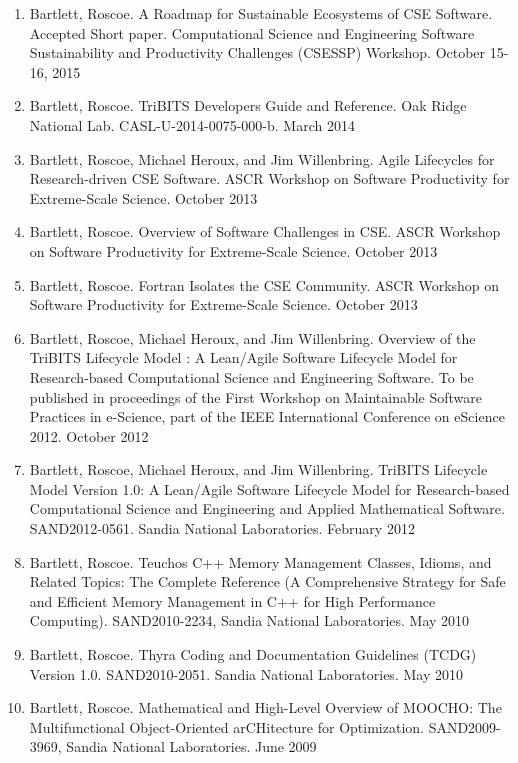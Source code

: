 \documentclass{report}
\begin{document}
\begin{enumerate}
%
{}\item Bartlett, Roscoe.  A Roadmap for Sustainable Ecosystems of CSE Software.  Accepted Short paper.  Computational Science and Engineering Software Sustainability and Productivity Challenges (CSESSP) Workshop.  October 15-16, 2015
%
{}\item Bartlett, Roscoe.  TriBITS Developers Guide and Reference. Oak Ridge National Lab. CASL-U-2014-0075-000-b.  March 2014
%
{}\item Bartlett, Roscoe, Michael Heroux, and Jim Willenbring.  Agile Lifecycles for Research-driven CSE Software. ASCR Workshop on Software Productivity for Extreme-Scale Science.  October 2013
%
{}\item Bartlett, Roscoe.  Overview of Software Challenges in CSE. ASCR Workshop on Software Productivity for Extreme-Scale Science.  October 2013
%
{}\item Bartlett, Roscoe.  Fortran Isolates the CSE Community. ASCR Workshop on Software Productivity for Extreme-Scale Science.  October 2013
%
{}\item Bartlett, Roscoe, Michael Heroux, and Jim Willenbring.  Overview of the TriBITS Lifecycle Model : A Lean/Agile Software Lifecycle Model for Research-based Computational Science and Engineering Software. To be published in proceedings of the First Workshop on Maintainable Software Practices in e-Science, part of the IEEE International Conference on eScience 2012.  October 2012
%
{}\item Bartlett, Roscoe, Michael Heroux, and Jim Willenbring.  TriBITS Lifecycle Model Version 1.0: A Lean/Agile Software Lifecycle Model for Research-based Computational Science and Engineering and Applied Mathematical Software. SAND2012-0561. Sandia National Laboratories. February 2012
%
{}\item Bartlett, Roscoe. Teuchos C++ Memory Management Classes, Idioms, and Related Topics: The Complete Reference (A Comprehensive Strategy for Safe and Efficient Memory Management in C++ for High Performance Computing). SAND2010-2234, Sandia National Laboratories. May 2010
%
{}\item Bartlett, Roscoe. Thyra Coding and Documentation Guidelines (TCDG) Version 1.0. SAND2010-2051. Sandia National Laboratories. May 2010
%
{}\item Bartlett, Roscoe. Mathematical and High-Level Overview of MOOCHO: The Multifunctional Object-Oriented arCHitecture for Optimization. SAND2009-3969, Sandia National Laboratories. June 2009

\end{enumerate}
\end{document}
